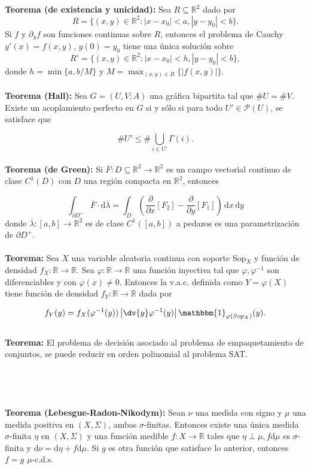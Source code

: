 \documentclass[a4paper,11pt, twocolumn]{article}
\newcommand{\RR}{\mathbb{R}}
\newcommand{\1}{\mathbbm{1}}
\begin{document}
\textbf{Teorema (de existencia y unicidad):} Sea $R\subseteq \RR^2$ dado por \[R=\{(x,y)\in \mathbb R^2: |x-x_0|<a,|y-y_0|<b\}.\] Si $f$ y $\partial_y f$ son funciones continuas sobre $R$, entonces el problema de Cauchy $y'(x)=f(x,y)$, $y(0)=y_0$ tiene una única solución sobre 
\[R' = \{(x,y)\in \mathbb R^2: |x-x_0|<h,|y-y_0|<b\},\] donde $h=\min\{a,b/M\}$ y $M = \max_{(x,y)\in R}\{|f(x,y)|\}$.\\\\

\textbf{Teorema (Hall):} Sea $G=(U,V; A)$ una gráfica bipartita tal que $\# U = \#V$. Existe un acoplamiento perfecto en $G$ si y sólo si para todo $U'\in \mathcal P(U)$, se satisface que 

\[\# U'\leq\# \bigcup_{i\in U'}\Gamma(i). \]\\

\textbf{Teorema (de Green):} Si $\overline{F} :D \subseteq \mathbb{R}^2 \rightarrow \mathbb{R}^2$ es un campo vectorial continuo de clase  $C^{1}(D)$ con $D$ una región compacta en $\mathbb{R}^2$, entonces

\[\int_{\partial D^{+}}\overline{F}\cdot \mathrm d\overline{\lambda} =\int_{D} \left( \dfrac{\partial}{\partial x}[F_{2}] - \dfrac{\partial}{\partial y}[F_{1}] \right)\, \mathrm dx\, \mathrm dy\]
donde $\overline{\lambda}: [a,b] \rightarrow \mathbb{R}^2$ es de clase $C^1([a,b])$ a pedazos es una parametrización de $\partial D^{+}$.\\\\


\textbf{Teorema:} Sea $X$ una variable aleatoria continua con soporte Sop$_X$ y función de densidad $f_X:\RR\rightarrow\RR$. Sea $\varphi:\RR\rightarrow \RR$ una función inyectiva tal que $\varphi,\varphi^{-1}$ son diferenciables y con $\varphi(x)\neq 0$. Entonces la v.a.c. definida como $Y=\varphi(X)$ tiene función de densidad $f_Y:\RR\rightarrow\RR$ dada por 

\[f_Y(y) = f_X(\varphi^{-1}(y))\left|\dv{y}\varphi^{-1}(y)\right|\1_{\varphi(Sop_X)}(y).\]\\

\textbf{Teorema:} El problema de decisión asociado al problema de empaquetamiento de conjuntos, se puede reducir en orden polinomial al problema SAT.\\\\\\\\\\

\textbf{Teorema (Lebesgue-Radon-Nikodym):} Sean $\nu$ una medida con signo y $\mu$ una medida positiva en $(X,\Sigma)$, ambas $\sigma$-finitas. Entonces existe una única medida $\sigma$-finita $\eta$ en $(X,\Sigma)$ y una función medible $f:X\to\RR$ tales que $\eta \perp \mu,f\mathrm{d}\mu $ es $\sigma$-finita y $\mathrm{d}\nu = \mathrm{d}\eta + f\mathrm{d}\mu $. Si $g$ es otra función que satisface lo anterior, entonces $f=g$ $\mu$-c.d.s.\\\\
\end{document}
